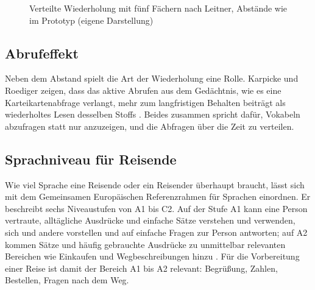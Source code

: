 \documentclass[12pt,a4paper]{scrreprt}
\begin{document}
\begin{figure}[!htb]
    \centering
    \caption{Verteilte Wiederholung mit fünf Fächern nach Leitner, Abstände wie im Prototyp (eigene Darstellung)}
    \label{fig:leitner}
\end{figure}

\subsection{Abrufeffekt}
Neben dem Abstand spielt die Art der Wiederholung eine Rolle. Karpicke und Roediger zeigen, dass das aktive Abrufen aus dem Gedächtnis, wie es eine Karteikartenabfrage verlangt, mehr zum langfristigen Behalten beiträgt als wiederholtes Lesen desselben Stoffs \cite{karpicke2008}. Beides zusammen spricht dafür, Vokabeln abzufragen statt nur anzuzeigen, und die Abfragen über die Zeit zu verteilen.

\subsection{Sprachniveau für Reisende}
Wie viel Sprache eine Reisende oder ein Reisender überhaupt braucht, lässt sich mit dem Gemeinsamen Europäischen Referenzrahmen für Sprachen einordnen. Er beschreibt sechs Niveaustufen von A1 bis C2. Auf der Stufe A1 kann eine Person vertraute, alltägliche Ausdrücke und einfache Sätze verstehen und verwenden, sich und andere vorstellen und auf einfache Fragen zur Person antworten; auf A2 kommen Sätze und häufig gebrauchte Ausdrücke zu unmittelbar relevanten Bereichen wie Einkaufen und Wegbeschreibungen hinzu \cite{cefr2020}. Für die Vorbereitung einer Reise ist damit der Bereich A1 bis A2 relevant: Begrüßung, Zahlen, Bestellen, Fragen nach dem Weg.
\end{document}
